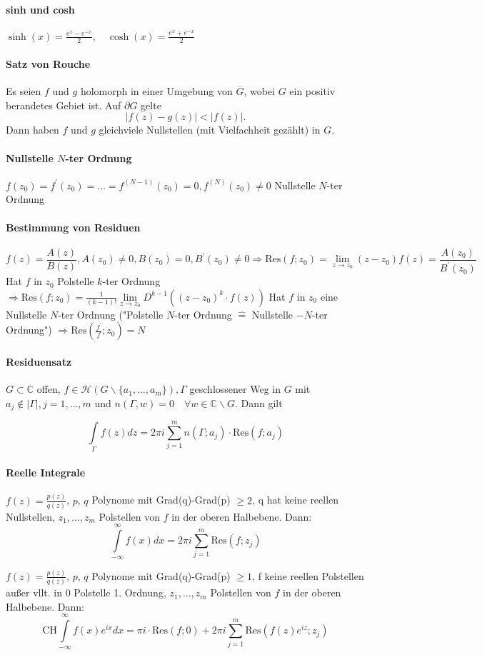 \documentclass[a4paper, 10pt, DIV20, headings=small]{scrartcl}
\theoremstyle{definition}
\theoremstyle{plain}
\begin{document}
\paragraph{sinh und cosh}
$\sinh(x) = \frac{e^x - e^{-x}}{2}, \quad \cosh(x) = \frac{e^x + e^{-x}}{2}$

\paragraph{Satz von Rouche}
Es seien $f$ und $g$ holomorph in einer Umgebung von $\overline{G}$, wobei $G$ ein positiv berandetes Gebiet ist. Auf $\partial G$ gelte
$$|f(z)-g(z)| < |f(z)|.$$
Dann haben $f$ und $g$ gleichviele Nullstellen (mit Vielfachheit gezählt) in $G$.

\paragraph{Nullstelle $N$-ter Ordnung}
$f(z_0) = f^\prime(z_0) = \ldots = f^{(N-1)}(z_0) = 0, f^{(N)}(z_0) \neq 0$ Nullstelle $N$-ter Ordnung

\paragraph{Bestimmung von Residuen}
$$f(z) = \frac{A(z)}{B(z)}, A(z_0) \neq 0, B(z_0) = 0, B^\prime(z_0) \neq 0 \Rightarrow \text{Res}(f;z_0) = \lim\limits_{z \to z_0} (z-z_0) f(z) = \frac{A(z_0)}{B^\prime(z_0)}$$
Hat $f$ in $z_0$ Polstelle $k$-ter Ordnung $\Rightarrow \text{Res}(f;z_0) = \frac{1}{(k-1)!} \lim\limits_{z \to z_0} D^{k-1} \left((z-z_0)^k \cdot f(z)\right)$
Hat $f$ in $z_0$ eine Nullstelle $N$-ter Ordnung ("Polstelle $N$-ter Ordnung $\hat{=}$ Nullstelle $-N$-ter Ordnung") $\Rightarrow \text{Res}\left(\frac{f^\prime}{f};z_0\right) = N$

\paragraph{Residuensatz}
$G \subset \mathbb{C}$ offen, $f \in \mathcal{H}(G \backslash \{a_1, \ldots, a_m\}), \Gamma$ geschlossener Weg in $G$ mit $a_j \notin |\Gamma|, j=1, \ldots, m$ und $n(\Gamma, w) = 0 \quad \forall w \in \mathbb{C} \backslash G$. Dann gilt

$$\int\limits_{\Gamma}{f(z) dz} = 2 \pi i \sum\limits_{j=1}^m{n(\Gamma; a_j) \cdot \text{Res}(f;a_j)}$$

\paragraph{Reelle Integrale}
$f(z) = \frac{p(z)}{q(z)}$, $p$, $q$ Polynome mit Grad(q)-Grad(p) $\geq 2$, q hat keine reellen Nullstellen,
$z_1, \ldots, z_m$ Polstellen von $f$ in der oberen Halbebene. Dann:
$$\int\limits_{-\infty}^{\infty}{f(x)dx} = 2 \pi i \sum\limits_{j=1}^m{\text{Res}(f;z_j)}$$

$f(z) = \frac{p(z)}{q(z)}$, $p$, $q$ Polynome mit Grad(q)-Grad(p) $\geq 1$, f keine reellen Polstellen außer vllt. in 0 Polstelle 1. Ordnung, $z_1, \ldots, z_m$ Polstellen von $f$ in der oberen Halbebene. Dann:
$$\text{CH} \int\limits_{-\infty}^{\infty}{f(x) e^{ix} dx} = \pi i \cdot \text{Res}(f;0) + 2 \pi i \sum\limits_{j=1}^m{\text{Res}(f(z) e^{iz};z_j)}$$
\end{document}
